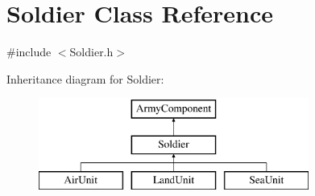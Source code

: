 \hypertarget{class_soldier}{}\section{Soldier Class Reference}
\label{class_soldier}


{\ttfamily \#include $<$Soldier.\+h$>$}

Inheritance diagram for Soldier\+:\begin{figure}[H]
\begin{center}
\leavevmode
\includegraphics[height=3.000000cm]{class_soldier}
\end{center}
\end{figure}
